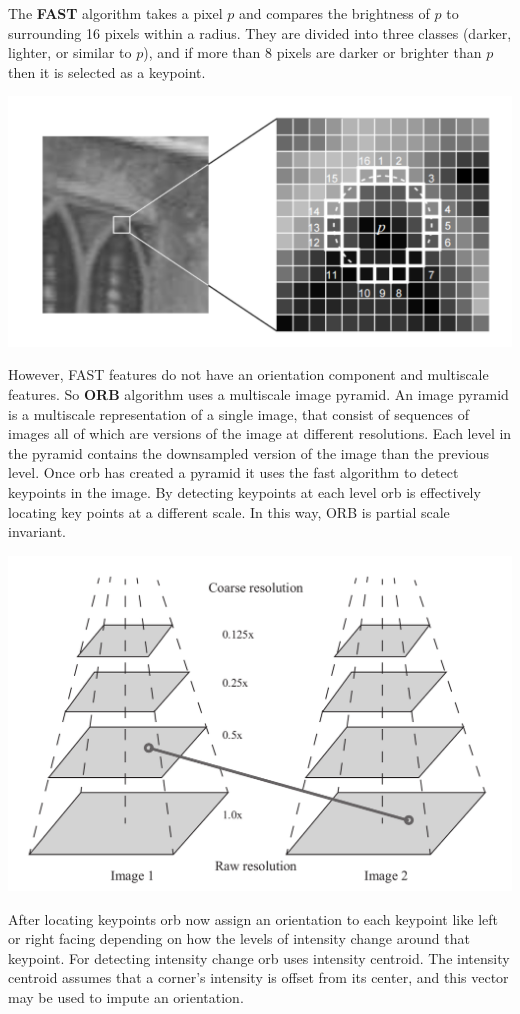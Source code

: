 \documentclass{article}
\theoremstyle{definition}
\theoremstyle{remark}
\theoremstyle{definition}
\begin{document}
The \textbf{FAST} algorithm takes a pixel $p$ and compares the brightness of $p$ to surrounding 16 pixels within a radius. They are divided into three classes (darker, lighter, or similar to $p$), and if more than $8$ pixels are darker or brighter than $p$ then it is selected as a keypoint. 
\begin{center}
    \includegraphics[scale=0.2]{img/FAST_points.png}
\end{center}
However, FAST features do not have an orientation component and multiscale features. So \textbf{ORB} algorithm uses a multiscale image pyramid. An image pyramid is a multiscale representation of a single image, that consist of sequences of images all of which are versions of the image at different resolutions. Each level in the pyramid contains the downsampled version of the image than the previous level. Once orb has created a pyramid it uses the fast algorithm to detect keypoints in the image. By detecting keypoints at each level orb is effectively locating key points at a different scale. In this way, ORB is partial scale invariant. 
\begin{center}
    \includegraphics[scale=0.2]{img/image_pyramid.png}
\end{center}
After locating keypoints orb now assign an orientation to each keypoint like left or right facing depending on how the levels of intensity change around that keypoint. For detecting intensity change orb uses intensity centroid. The intensity centroid assumes that a corner’s intensity is offset from its center, and this vector may be used to impute an orientation. 
\end{document}
